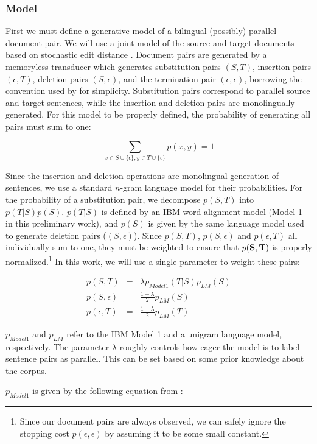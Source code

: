 \documentclass[11pt,letterpaper]{article}
\newcommand{\remove}[1]{}
\begin{document}
\subsubsection{Model}

First we must define a generative model of a bilingual (possibly) parallel
document pair. We will use a joint model of the source and target documents
based on stochastic edit distance \cite{Ristad98}. Document pairs are
generated by a memoryless transducer which generates substitution pairs $(S,T)$,
insertion pairs $(\epsilon, T)$, deletion pairs $(S,\epsilon)$, and the
termination pair $(\epsilon, \epsilon)$, borrowing the convention used by
\cite{Oncina06} for simplicity. Substitution pairs correspond to parallel
source and target sentences, while the insertion and deletion pairs are
monolingually generated. For this model to be properly defined, the probability
of generating all pairs must sum to one:

\begin{equation}
\sum_{x \in S\cup \{\epsilon\}, y \in T\cup \{\epsilon\}} p(x,y) = 1
\end{equation}

Since the insertion and deletion operations are monolingual generation of
sentences, we use a standard $n$-gram language model for their probabilities.
For the probability of a substitution pair, we decompose $p(S,T)$ into
$p(T|S)p(S)$. $p(T|S)$ is defined by an IBM word alignment model \cite{Brown93}
(Model 1 in this preliminary work), and $p(S)$ is given by the same language
model used to generate deletion pairs ($(S,\epsilon)$). Since $p(S,T)$,
$p(S,\epsilon)$ and $p(\epsilon,T)$ all individually sum to one, they must be
weighted to ensure that $p({\bf S},{\bf T})$ is properly
normalized.\footnote{Since our document pairs are always observed, we can safely
ignore the stopping cost $p(\epsilon, \epsilon)$ by assuming it to be some small
constant.} In this work, we will use a single parameter to weight these pairs:

\begin{align*}
p(S,T) &=& \lambda p_{Model1}(T|S) p_{LM}(S)\\
p(S,\epsilon) &=& \frac{1-\lambda}{2} p_{LM}(S)\\
p(\epsilon,T) &=& \frac{1-\lambda}{2} p_{LM}(T)
\end{align*}

$p_{Model1}$ and $p_{LM}$ refer to the IBM Model 1 and a unigram language model,
respectively. The parameter $\lambda$ roughly controls how eager the model
is to label sentence pairs as parallel. This can be set based on some prior
knowledge about the corpus.
\remove{
We will explore additional methods for setting
$\lambda$ in Section \ref{sec:extensions}.
}
$p_{Model1}$ is given by the
following equation from \cite{Brown93}:
\end{document}
